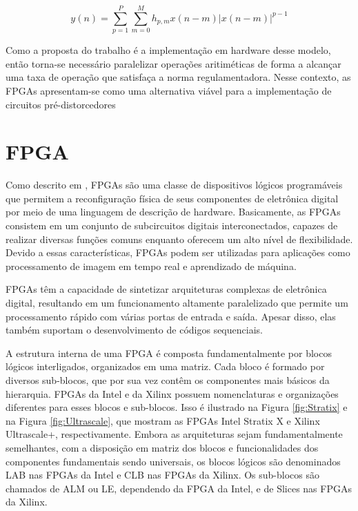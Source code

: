 \begin{equation}
    y(n) = \sum_{p=1}^{P} \sum_{m=0}^{M} h_{p,m} x(n - m) \left| x(n - m) \right|^{p-1}
    \label{eq:mp}
\end{equation}

Como a proposta do trabalho é a implementação em hardware desse modelo, então torna-se necessário paralelizar operações aritiméticas de forma a alcançar uma taxa de operação que satisfaça a norma regulamentadora. Nesse contexto, as FPGAs apresentam-se como uma alternativa viável para a implementação de circuitos pré-distorcedores 

\section{FPGA}

Como descrito em \cite{Pedroni2010}, FPGAs são uma classe de dispositivos lógicos programáveis que permitem a reconfiguração física de seus componentes de eletrônica digital por meio de uma linguagem de descrição de hardware. Basicamente, as FPGAs consistem em um conjunto de subcircuitos digitais interconectados, capazes de realizar diversas funções comuns enquanto oferecem um alto nível de flexibilidade. Devido a essas características, FPGAs podem ser utilizadas para aplicações como processamento de imagem em tempo real e aprendizado de máquina.

FPGAs têm a capacidade de sintetizar arquiteturas complexas de eletrônica digital, resultando em um funcionamento altamente paralelizado que permite um processamento rápido com várias portas de entrada e saída. Apesar disso, elas também suportam o desenvolvimento de códigos sequenciais.

A estrutura interna de uma FPGA é composta fundamentalmente por blocos lógicos interligados, organizados em uma matriz. Cada bloco é formado por diversos sub-blocos, que por sua vez contêm os componentes mais básicos da hierarquia. FPGAs da Intel e da Xilinx possuem nomenclaturas e organizações diferentes para esses blocos e sub-blocos. Isso é ilustrado na Figura \ref{fig:Stratix} e na Figura \ref{fig:Ultrascale}, que mostram as FPGAs Intel Stratix X e Xilinx Ultrascale+, respectivamente. Embora as arquiteturas sejam fundamentalmente semelhantes, com a disposição em matriz dos blocos e funcionalidades dos componentes fundamentais sendo universais, os blocos lógicos são denominados LAB nas FPGAs da Intel e CLB nas FPGAs da Xilinx. Os sub-blocos são chamados de ALM ou LE, dependendo da FPGA da Intel, e de Slices nas FPGAs da Xilinx.

